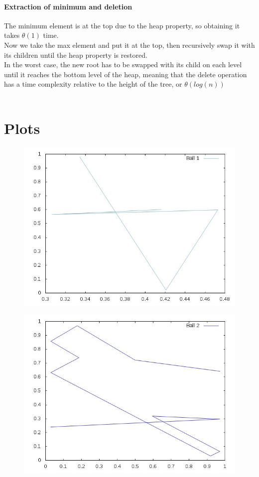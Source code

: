\documentclass[12pt]{article}
\begin{document}
\paragraph{Extraction of minimum and deletion}
The minimum element is at the top due to the heap property, so obtaining it takes $\theta(1)$ time.\\
Now we take the max element and put it at the top, then recursively swap it with its children until the heap property is restored.\\
In the worst case, the new root has to be swapped with its child on each level until it reaches the bottom level of the heap, meaning that the delete operation has a time complexity relative to the height of the tree, or $\theta(log(n))$\\\


\section{Plots}\label{plots}


\begin{figure}[ht!]
\centering
\includegraphics[width=12cm]{plot1.jpg}
\end{figure}

\begin{figure}[ht!]
\centering
\includegraphics[width=12cm]{plot2.jpg}
\end{figure}
\end{document}
